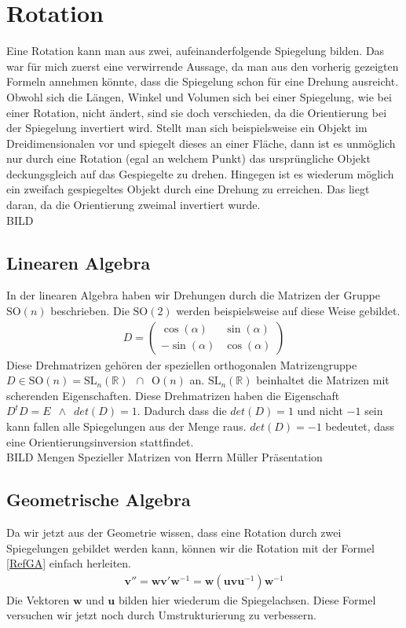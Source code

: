 %
%
%
\section{Rotation}

Eine Rotation kann man aus zwei, aufeinanderfolgende Spiegelung bilden. Das war für mich zuerst eine verwirrende Aussage, da man aus den vorherig gezeigten Formeln annehmen könnte, dass die Spiegelung schon für eine Drehung ausreicht. Obwohl sich die Längen, Winkel und Volumen sich bei einer Spiegelung, wie bei einer Rotation, nicht ändert, sind sie doch verschieden, da die Orientierung bei der Spiegelung invertiert wird. Stellt man sich beispielsweise ein Objekt im Dreidimensionalen vor und spiegelt dieses an einer Fläche, dann ist es unmöglich nur durch eine Rotation (egal an welchem Punkt) das ursprüngliche Objekt deckungsgleich auf das Gespiegelte zu drehen. Hingegen ist es wiederum möglich ein zweifach gespiegeltes Objekt durch eine Drehung zu erreichen. Das liegt daran, da die Orientierung zweimal invertiert wurde.
\\BILD

\subsection{Linearen Algebra}
In der linearen Algebra haben wir Drehungen durch die Matrizen der Gruppe $\text{SO}(n)$ beschrieben. Die $\text{SO}(2)$  werden beispielsweise auf diese Weise gebildet.
\begin{align}
	D = 
	\begin{pmatrix}
		\cos(\alpha) & \sin(\alpha) \\
		-\sin(\alpha) & \cos(\alpha) 
	\end{pmatrix}
\end{align}
Diese Drehmatrizen gehören der speziellen orthogonalen Matrizengruppe $D\in \text{SO}(n) = \text{SL}_n(\mathbb{R})\enspace \cap \enspace \text{O}(n)$ an. $\text{SL}_n(\mathbb{R})$ beinhaltet die Matrizen mit scherenden Eigenschaften. Diese Drehmatrizen haben die Eigenschaft $D^t D = E \enspace \land \enspace det(D)=1$. Dadurch dass die $det(D) = 1$ und nicht $-1$ sein kann fallen alle Spiegelungen aus der Menge raus. $det(D) = -1$ bedeutet, dass eine Orientierungsinversion stattfindet.  
\\BILD Mengen Spezieller Matrizen von Herrn Müller Präsentation

\subsection{Geometrische Algebra}
Da wir jetzt aus der Geometrie wissen, dass eine Rotation durch zwei Spiegelungen gebildet werden kann, können wir die Rotation mit der Formel \eqref{RefGA} einfach herleiten.
\begin{align} \label{rotGA}
	\mathbf{v}'' = \mathbf{wv}'\mathbf{w}^{-1} = \mathbf{w}(\mathbf{uvu}^{-1})\mathbf{w}^{-1} 
\end{align}
Die Vektoren $\mathbf{w}$ und $\mathbf{u}$ bilden hier wiederum die Spiegelachsen. Diese Formel versuchen wir jetzt noch durch Umstrukturierung zu verbessern. 
